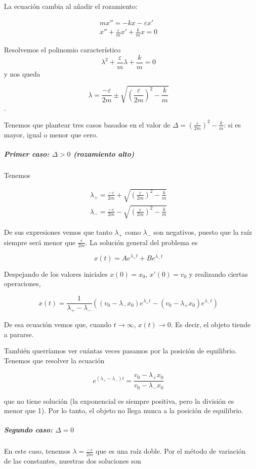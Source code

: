 La ecuación cambia al añadir el rozamiento:

\begin{gather} mx'' = -kx - εx' \nonumber \\
x'' + \frac{ε}{m}x' + \frac{k}{m}x = 0
\end{gather}

Resolvemos el polinomio característico \[ λ^2 + \frac{ε}{m}λ + \frac{k}{m} = 0 \] y nos queda

\[ λ = \frac{-ε}{2m} \pm \sqrt{\left(\frac{ε}{2m}\right)^2 - \frac{k}{m}} \].

Tenemos que plantear tres casos basados en el valor de $Δ =\left(\frac{ε}{2m}\right)^2 - \frac{k}{m}$: si es mayor, igual o menor que cero.

\subparagraph{Primer caso: $Δ > 0$ (rozamiento alto)}

Tenemos

\begin{gather*}
λ_+ = \frac{-ε}{2m} + \sqrt{\left(\frac{ε}{2m}\right)^2 - \frac{k}{m}} \\
λ_- = \frac{-ε}{2m} - \sqrt{\left(\frac{ε}{2m}\right)^2 - \frac{k}{m}} 
\end{gather*}

De sus expresiones vemos que tanto $λ_+$ como $λ_-$ son negativos, puesto que la raíz siempre será menor que $\frac{\epsilon}{2m}$. La solución general del problema es

\[ x(t) = Ae^{λ_+t} + Be^{λ_-t} \]

Despejando de los valores iniciales $x(0) = x_0$, $x'(0) = v_0$ y realizando ciertas operaciones,

\[ x(t) = \frac{1}{λ_+ - λ_-}\left((v_0-λ_-x_0)e^{λ_+t} - (v_0-λ_+x_0)e^{λ_-t}\right) \]

De esa ecuación vemos que, cuando $t\to ∞$, $x(t) \to 0$. Es decir, el objeto tiende a pararse.

También querríamos ver cuántas veces pasamos por la posición de equilibrio. Tenemos que resolver la ecuación

\[ e^{(λ_+ - λ_-)t} = \frac{v_0-λ_+x_0}{v_0-λ_-x_0} \]

que no tiene solución (la exponencial es siempre positiva, pero la división es menor que 1). Por lo tanto, el objeto no llega nunca a la posición de equilibrio.

\subparagraph{Segundo caso: $Δ=0$}

En este caso, tenemos $λ=\frac{-ε}{2m}$ que es una raíz doble. Por el método de variación de las constantes, nuestras dos soluciones son

